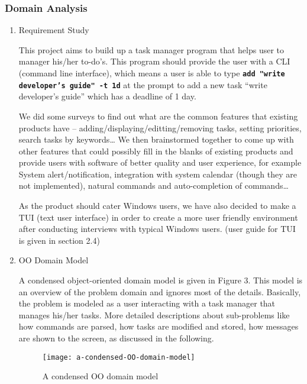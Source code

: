 \documentclass[12pt, a4paper]{article}
\newcommand{\cmdinline}[1]{{\bf \texttt{#1}}}
\begin{document}
\subsubsection{Domain Analysis}
\begin{enumerate} 
\item Requirement Study

This project aims to build up a task manager program that helps user to manager  his/her
to-do's. This program should provide the user with a CLI (command line interface), which means a
user is able to type \mbox{\cmdinline{add "write developer's guide" -t 1d}} at the prompt to add a new task ``write developer's guide'' which has a deadline of 1 day.

We did some surveys to find out what are the common features that existing products have -- adding/displaying/editting/removing tasks, setting priorities, search tasks by keywords\ldots
We then brainstormed together to come up with other features that could possibly fill in the blanks of existing products and provide users with software of better quality and user experience, for example System alert/notification, integration with system calendar (though they are not implemented), natural commands and auto-completion of commands\ldots

As the product should cater Windows users, we have also decided to make a TUI (text user interface) in order to create a
more user friendly environment after conducting interviews with typical Windows users. (user guide for TUI is given in section 2.4)

\item OO Domain Model

A condensed object-oriented domain model is given in Figure 3. This model is an overview of the
problem domain and ignores most of the details. Basically, the problem is modeled as a user
interacting with a task manager that manages his/her tasks. More detailed descriptions about sub-problems like
how commands are parsed, how tasks are modified and stored, how messages are shown to the screen, as discussed in the following.

\begin{figure}[h]
  \centering
  \texttt{[image: a-condensed-OO-domain-model]}
  \caption{A condensed OO domain model}
\end{figure}
\end{enumerate}
\end{document}
